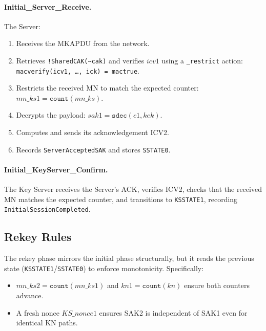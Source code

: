 \begin{sloppypar}
\paragraph{Initial\_Server\_Receive.} The Server:
\begin{enumerate}
  \item Receives the MKAPDU from the network.
  \item Retrieves \texttt{!SharedCAK(\textasciitilde cak)} and verifies $\mathit{icv1}$ using a \texttt{\_restrict} action: \texttt{macverify(icv1, \ldots, ick) = mactrue}.
  \item Restricts the received MN to match the expected counter:
    $\mathit{mn\_ks1} = \mathtt{count}(\mathit{mn\_ks})$.
  \item Decrypts the payload: $\mathit{sak1} = \mathtt{sdec}(\mathit{c1}, \mathit{kek})$.
  \item Computes and sends its acknowledgement ICV2.
  \item Records \texttt{ServerAcceptedSAK} and stores \texttt{SSTATE0}.
\end{enumerate}
\end{sloppypar}

\paragraph{Initial\_KeyServer\_Confirm.} The Key Server receives the Server's ACK, verifies ICV2, checks that the received MN matches the expected counter, and transitions to \texttt{KSSTATE1}, recording \texttt{InitialSessionCompleted}.

\subsection{Rekey Rules}

The rekey phase mirrors the initial phase structurally, but it reads the previous state (\texttt{KSSTATE1}/\texttt{SSTATE0}) to enforce monotonicity. Specifically:

\begin{itemize}
  \item $\mathit{mn\_ks2} = \mathtt{count}(\mathit{mn\_ks1})$ and $\mathit{kn1} = \mathtt{count}({\mathit{kn}})$ ensure both counters advance.
  \item A fresh nonce ${\mathit{KS\_nonce1}}$ ensures SAK2 is independent of SAK1 even for identical KN paths.
  
\end{itemize}

